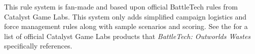 This rule system is fan-made and based upon official BattleTech rules from Catalyst Game Labs.
This system only adds simplified campaign logistics and force management rules along with sample scenarios and scoring.
See the  for a list of official Catalyst Game Labs products that \emph{BattleTech: Outworlds Wastes} specifically references.
